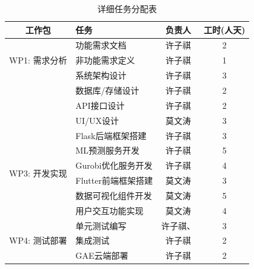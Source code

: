 \begin{table}[H]
    \centering
    \caption{详细任务分配表}
    \label{tab:task_assignment}
    \begin{tabular}{clcc}
        \toprule
        \textbf{工作包}                    & \textbf{任务}   & \textbf{负责人} & \textbf{工时(人天)} \\
        \midrule
        \multirow{3}{*}{WP1: 需求分析}

                                        & 功能需求文档        & 许子祺          & 2               \\
                                        & 非功能需求定义       & 许子祺          & 1               \\
        \midrule
        \multirow{4}{*}{WP2: 系统设计}
                                        & 系统架构设计        & 许子祺          & 3               \\
                                        & 数据库/存储设计      & 许子祺          & 2               \\
                                        & API接口设计       & 许子祺          & 2               \\
                                        & UI/UX设计       & 莫文涛          & 3               \\
        \midrule
        \multirow{6}{*}{WP3: 开发实现}
                                        & Flask后端框架搭建   & 许子祺          & 3               \\
                                        & ML预测服务开发      & 许子祺          & 5               \\
                                        & Gurobi优化服务开发  & 许子祺          & 4               \\
                                        & Flutter前端框架搭建 & 莫文涛          & 3               \\
                                        & 数据可视化组件开发     & 莫文涛          & 5               \\
                                        & 用户交互功能实现      & 莫文涛          & 4               \\
        \midrule
        \multirow{3}{*}{WP4: 测试部署}
                                        & 单元测试编写        & 许子祺、         & 3               \\
                                        & 集成测试          & 许子祺          & 2               \\
                                        & GAE云端部署       & 许子祺          & 2               \\

\end{tabular}
\end{table}
